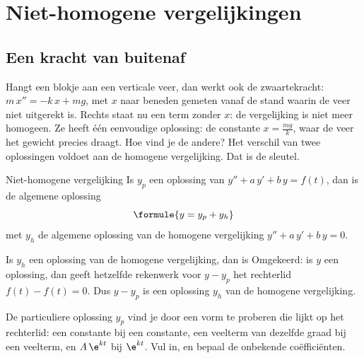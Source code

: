 \begin{oefeningen}
\end{oefeningen}

\section{Niet-homogene vergelijkingen}

\subsection{Een kracht van buitenaf}

Hangt een blokje aan een verticale veer, dan werkt ook de zwaartekracht: $m\,x'' = -k\,x + mg$, met $x$ naar beneden gemeten vanaf de stand waarin de veer niet uitgerekt is. Rechts staat nu een term zonder $x$: de vergelijking is niet meer homogeen. Ze heeft één eenvoudige oplossing: de constante $x = \tfrac{mg}{k}$, waar de veer het gewicht precies draagt. Hoe vind je de andere? Het verschil van twee oplossingen voldoet aan de homogene vergelijking. Dat is de sleutel.

\begin{theorie}
\begin{stelling}{Niet-homogene vergelijking}
Is $y_p$ een oplossing van $y'' + a\,y' + b\,y = f(t)$, dan is de algemene oplossing
\[
\formule{y = y_p + y_h}
\]
met $y_h$ de algemene oplossing van de homogene vergelijking $y'' + a\,y' + b\,y = 0$.
\end{stelling}

\begin{bewijs}
Is $y_h$ een oplossing van de homogene vergelijking, dan is
Omgekeerd: is $y$ een oplossing, dan geeft hetzelfde rekenwerk voor $y - y_p$ het rechterlid $f(t) - f(t) = 0$. Dus $y - y_p$ is een oplossing $y_h$ van de homogene vergelijking.
\end{bewijs}
\end{theorie}

De particuliere oplossing $y_p$ vind je door een vorm te proberen die lijkt op het rechterlid: een constante bij een constante, een veelterm van dezelfde graad bij een veelterm, en $A\,\e^{kt}$ bij $\e^{kt}$. Vul in, en bepaal de onbekende coëfficiënten.

